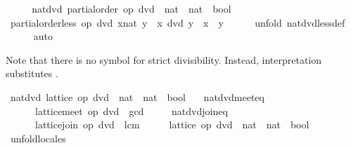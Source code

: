 \begin{isabellebody}
\ \ \isamarkupfalse%
\ \isamarkupfalse%
\ nat{\isacharunderscore}dvd{\isacharcolon}\ partial{\isacharunderscore}order\ {\isachardoublequoteopen}op\ dvd\ {\isacharcolon}{\isacharcolon}\ nat\ {\isasymRightarrow}\ nat\ {\isasymRightarrow}\ bool{\isachardoublequoteclose}\ \isacommand{{\isachardot}}\isamarkupfalse%
\isanewline
\ \ \isamarkupfalse%
\ {\isachardoublequoteopen}partial{\isacharunderscore}order{\isachardot}less\ op\ dvd\ {\isacharparenleft}x{\isacharcolon}{\isacharcolon}nat{\isacharparenright}\ y\ {\isacharequal}\ {\isacharparenleft}x\ dvd\ y\ {\isasymand}\ x\ {\isasymnoteq}\ y{\isacharparenright}{\isachardoublequoteclose}\isanewline
\ \ \ \ \isamarkupfalse%
\ {\isacharparenleft}unfold\ nat{\isacharunderscore}dvd{\isachardot}less{\isacharunderscore}def{\isacharparenright}\isanewline
\ \ \ \ \isamarkupfalse%
\ auto\isanewline
\ \ \ \ \isamarkupfalse%
\isanewline
{}\isamarkupfalse%
%
\endisatagproof
{\isafoldproof}%
%
\isadelimproof
%
\endisadelimproof
%
\begin{isamarkuptext}%
Note that there is no symbol for strict divisibility.  Instead,
  interpretation substitutes .%
\end{isamarkuptext}%
\isamarkuptrue%
\isamarkupfalse%
\ nat{\isacharunderscore}dvd{\isacharcolon}\ lattice\ {\isachardoublequoteopen}op\ dvd\ {\isacharcolon}{\isacharcolon}\ nat\ {\isasymRightarrow}\ nat\ {\isasymRightarrow}\ bool{\isachardoublequoteclose}\isanewline
\ \ \ nat{\isacharunderscore}dvd{\isacharunderscore}meet{\isacharunderscore}eq{\isacharcolon}\isanewline
\ \ \ \ \ \ {\isachardoublequoteopen}lattice{\isachardot}meet\ op\ dvd\ {\isacharequal}\ gcd{\isachardoublequoteclose}\isanewline
\ \ \ \ \ nat{\isacharunderscore}dvd{\isacharunderscore}join{\isacharunderscore}eq{\isacharcolon}\isanewline
\ \ \ \ \ \ {\isachardoublequoteopen}lattice{\isachardot}join\ op\ dvd\ {\isacharequal}\ lcm{\isachardoublequoteclose}\isanewline
%
\isadelimproof
%
\endisadelimproof
%
\isatagproof
{}\isamarkupfalse%
\ {\isacharminus}\isanewline
\ \ \isamarkupfalse%
\ {\isachardoublequoteopen}lattice\ {\isacharparenleft}op\ dvd\ {\isacharcolon}{\isacharcolon}\ nat\ {\isasymRightarrow}\ nat\ {\isasymRightarrow}\ bool{\isacharparenright}{\isachardoublequoteclose}\isanewline
\ \ \ \ \isamarkupfalse%
\ unfold{\isacharunderscore}locales\isanewline

\end{isabellebody}
